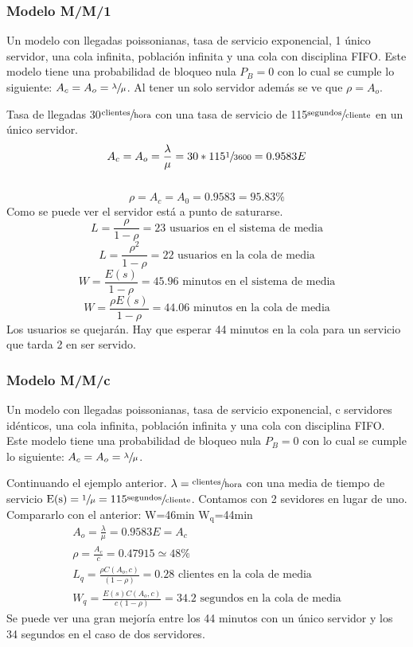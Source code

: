 \subsubsection{Modelo M/M/1}
Un modelo con llegadas poissonianas, tasa de servicio exponencial, 1 único servidor, una cola infinita, población infinita y una cola con disciplina FIFO. Este modelo tiene una probabilidad de bloqueo nula $P_B=0$ con lo cual se cumple lo siguiente: $A_c=A_o=\sfrac{\lambda}{\mu}$. Al tener un solo servidor además se ve que $\rho=A_o$.
\begin{example}[M/M/1]
Tasa de llegadas 30$\sfrac{\text{clientes}}{\text{hora}}$ con una tasa de servicio de 115$\sfrac{\text{segundos}}{\text{cliente}}$ en un único servidor.
\[A_c=A_o=\frac{\lambda}{\mu}=30*115\sfrac{1}{3600}=0.9583E\] \\
\[\rho=A_c=A_0=0.9583=95.83\%\] Como se puede ver el servidor está a punto de saturarse.\\
\[L=\frac{\rho}{1-\rho}=23\text{ usuarios en el sistema de media}\]
\[L=\frac{\rho^2}{1-\rho}=22\text{ usuarios en la cola de media}\]
\[W=\frac{E(s)}{1-\rho}=45.96\text{ minutos en el sistema de media}\]
\[W=\frac{\rho E(s)}{1-\rho}=44.06\text{ minutos en la cola de media}\]
Los usuarios se quejarán. Hay que esperar 44 minutos en la cola para un servicio que tarda 2 en ser servido.
\end{example}
\subsubsection{Modelo M/M/c}
Un modelo con llegadas poissonianas, tasa de servicio exponencial, c servidores idénticos, una cola infinita, población infinita y una cola con disciplina FIFO. Este modelo tiene una probabilidad de bloqueo nula $P_B=0$ con lo cual se cumple lo siguiente: $A_c=A_o=\sfrac{\lambda}{\mu}$.\\
\begin{example}[M/M/c]
Continuando el ejemplo anterior. $\lambda=\sfrac{\text{clientes}}{\text{hora}}$ con una media de tiempo de servicio $\text{E(s)}=\sfrac{1}{\mu}=115\sfrac{\text{segundos}}{\text{cliente}}$. Contamos con 2 sevidores en lugar de uno. Compararlo con el anterior: W=46min $\text{W}_{\text{q}}$=44min\\
\begin{gather*}
A_o=\frac{\lambda}{\mu}=0.9583E=A_c\\
\rho=\frac{A_c}{c}=0.47915\simeq 48\% \\
L_q=\frac{\rho C(A_o,c)}{(1-\rho)}=0.28\text{ clientes en la cola de media}\\
W_q=\frac{E(s)C(A_o,c)}{c(1-\rho)}=34.2\text{ segundos en la cola de media}
\end{gather*}
Se puede ver una gran mejoría entre los 44 minutos con un único servidor y los 34 segundos en el caso de dos servidores.
\end{example}
